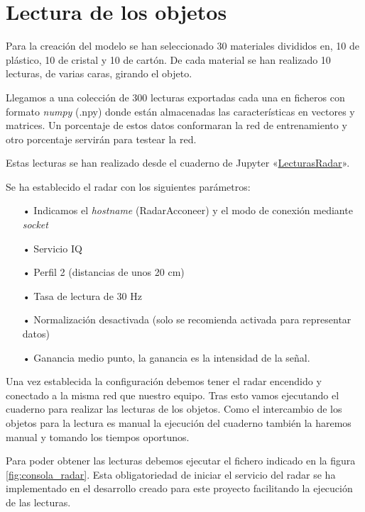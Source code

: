 \section{Lectura de los objetos}

Para la creación del modelo se han seleccionado 30 materiales divididos en, 10 de plástico, 10 de cristal y 10 de cartón. De cada material se han realizado 10 lecturas, de varias caras, girando el objeto.

Llegamos a una colección de 300 lecturas exportadas cada una en ficheros con formato \textit{numpy} (.npy) donde están almacenadas las características en vectores y matrices. Un porcentaje de estos datos conformaran la red de entrenamiento y otro porcentaje servirán para testear la red.

Estas lecturas se han realizado desde el cuaderno de Jupyter «\href{https://github.com/mecyc/TFG_RADAR_60GHZ/scripts/LecturasRadar.ipynb}{LecturasRadar}».



Se ha establecido el radar con los siguientes parámetros:
\begin{itemize}
	\item[•]Indicamos el \textit{hostname} (RadarAcconeer) y el modo de conexión mediante \textit{socket}
	\item[•]Servicio IQ
	\item[•]Perfil 2 (distancias de unos 20 cm)
	\item[•]Tasa de lectura de 30 Hz
	\item[•]Normalización desactivada (solo se recomienda activada para representar datos)
	\item[•]Ganancia medio punto, la ganancia es la intensidad de la señal.
\end{itemize}

Una vez establecida la configuración debemos tener el radar encendido y conectado a la misma red que nuestro equipo. Tras esto vamos ejecutando el cuaderno para realizar las lecturas de los objetos. Como el intercambio de los objetos para la lectura es manual la ejecución del cuaderno también la haremos manual y tomando los tiempos oportunos.

Para poder obtener las lecturas debemos ejecutar el fichero indicado en la figura \ref{fig:consola_radar}. Esta obligatoriedad de iniciar el servicio del radar se ha implementado en el desarrollo creado para este proyecto facilitando la ejecución de las lecturas.



